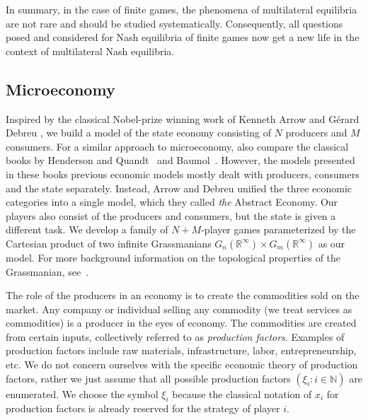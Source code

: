 \documentclass[a4paper,11pt,reqno,english]{amsart}
\theoremstyle{plain}
\theoremstyle{definition}
\begin{document}
\medskip
In summary, in the case of finite games, the phenomena of multilateral equilibria are not rare and should be studied systematically.
Consequently, all questions posed and considered for Nash equilibria of finite games now get a new life in the context of multilateral Nash equilibria.

\subsection{Microeconomy}

Inspired by the classical Nobel-prize winning work of Kenneth Arrow and G\'erard Debreu \cite{ArrowDebreu1954}, we build a model of the state economy consisting of $N$ producers and $M$ consumers.
For a similar approach to microeconomy, also compare the classical books by Henderson and Quandt~\cite{HendersonQuandt1958} and Baumol~\cite{Baumol1965}.
However, the models presented in these books previous economic models mostly dealt with producers, consumers and the state separately. Instead, Arrow and Debreu unified the three economic categories into a single model, which they called \textit{the} Abstract Economy. Our players also consist of the producers and consumers, but the state is given a different task.
We develop a family of $N+M$-player games parameterized by the Cartesian product of two infinite Grassmanians $G_n(\mathbb{R}^{\infty})\times G_m(\mathbb{R}^{\infty})$ as our model. For more background information on the topological properties of the Grassmanian, see~\cite[Sec.\,5]{Milnor1974}. 

\medskip
The role of the producers in an economy is to create the commodities sold on the market. Any company or individual selling any commodity (we treat services as commodities) is a producer in the eyes of economy. The commodities are created from certain inputs, collectively referred to as \textit{production factors}. Examples of production factors include raw materials, infrastructure, labor, entrepreneurship, etc. We do not concern ourselves with the specific economic theory of production factors, rather we just assume that all possible production factors $(\xi_i : i\in\mathbb{N})$ are enumerated. We choose the symbol $\xi_i$ because the classical notation of $x_i$ for production factors is already reserved for the strategy of player $i$.
\end{document}
